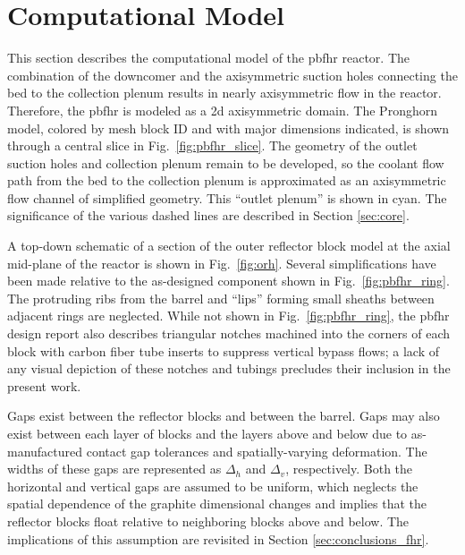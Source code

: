 \section{Computational Model}
\label{sec:pbfhr_model}

This section describes the computational model of the \gls{pbfhr} reactor. The combination of the downcomer and the axisymmetric suction holes connecting the bed to the collection plenum results in nearly axisymmetric flow in the reactor. Therefore, the \gls{pbfhr} is modeled as a \gls{2d} axisymmetric domain. The Pronghorn model, colored by mesh block ID and with major dimensions indicated, is shown through a central slice in Fig.\ \ref{fig:pbfhr_slice}. The geometry of the outlet suction holes and collection plenum remain to be developed, so the coolant flow path from the bed to the collection plenum is approximated as an axisymmetric flow channel of simplified geometry. This ``outlet plenum'' is shown in cyan. The significance of the various dashed lines are described in Section \ref{sec:core}.

A top-down schematic of a section of the outer reflector block model at the axial mid-plane of the reactor is shown in Fig.\ \ref{fig:orh}. Several simplifications have been made relative to the as-designed component shown in Fig.\ \ref{fig:pbfhr_ring}. The protruding ribs from the barrel and ``lips'' forming small sheaths between adjacent rings are neglected. While not shown in Fig.\ \ref{fig:pbfhr_ring}, the \gls{pbfhr} design report also describes triangular notches machined into the corners of each block with carbon fiber tube inserts to suppress vertical bypass flows; a lack of any visual depiction of these notches and tubings precludes their inclusion in the present work. 

Gaps exist between the reflector blocks and between the barrel. Gaps may also exist between each layer of blocks and the layers above and below due to as-manufactured contact gap tolerances and spatially-varying deformation. The widths of these gaps are represented as \(\Delta_h\) and \(\Delta_v\), respectively. Both the horizontal and vertical gaps are assumed to be uniform, which neglects the spatial dependence of the graphite dimensional changes and implies that the reflector blocks float relative to neighboring blocks above and below. The implications of this assumption are revisited in Section \ref{sec:conclusions_fhr}.

